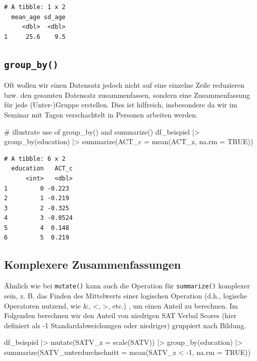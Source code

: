 \documentclass[
  letterpaper,
  DIV=11,
  numbers=noendperiod]{scrreprt}
\newenvironment{Shaded}{\begin{snugshade}}{\end{snugshade}}
\newcommand{\AttributeTok}[1]{\textcolor[rgb]{0.40,0.45,0.13}{#1}}
\newcommand{\CommentTok}[1]{\textcolor[rgb]{0.37,0.37,0.37}{#1}}
\newcommand{\ConstantTok}[1]{\textcolor[rgb]{0.56,0.35,0.01}{#1}}
\newcommand{\DecValTok}[1]{\textcolor[rgb]{0.68,0.00,0.00}{#1}}
\newcommand{\FunctionTok}[1]{\textcolor[rgb]{0.28,0.35,0.67}{#1}}
\newcommand{\NormalTok}[1]{\textcolor[rgb]{0.00,0.23,0.31}{#1}}
\newcommand{\SpecialCharTok}[1]{\textcolor[rgb]{0.37,0.37,0.37}{#1}}
\begin{document}
\begin{verbatim}
# A tibble: 1 x 2
  mean_age sd_age
     <dbl>  <dbl>
1     25.6    9.5
\end{verbatim}

\subsection{\texorpdfstring{\texttt{group\_by()}}{group\_by()}}\label{group_by}

Oft wollen wir einen Datensatz jedoch nicht auf eine einzelne Zeile
reduzieren bzw. den gesamten Datensatz zusammenfassen, sondern eine
Zusammenfassung für jede (Unter-)Gruppe erstellen. Dies ist hilfreich,
insbesondere da wir im Seminar mit Tagen verschachtelt in Personen
arbeiten werden.

\begin{Shaded}
\begin{Highlighting}[]
\CommentTok{\# illustrate use of group\_by() and summarize()}
\NormalTok{df\_beispiel }\SpecialCharTok{|\textgreater{}} 
  \FunctionTok{group\_by}\NormalTok{(education) }\SpecialCharTok{|\textgreater{}} 
  \FunctionTok{summarize}\NormalTok{(}\AttributeTok{ACT\_c =} \FunctionTok{mean}\NormalTok{(ACT\_z, }\AttributeTok{na.rm =} \ConstantTok{TRUE}\NormalTok{))}
\end{Highlighting}
\end{Shaded}

\begin{verbatim}
# A tibble: 6 x 2
  education   ACT_c
      <int>   <dbl>
1         0 -0.223 
2         1 -0.219 
3         2 -0.325 
4         3 -0.0524
5         4  0.148 
6         5  0.219 
\end{verbatim}

\subsection{Komplexere
Zusammenfassungen}\label{komplexere-zusammenfassungen}

Ähnlich wie bei \texttt{mutate()} kann auch die Operation für
\texttt{summarize()} komplexer sein, z. B. das Finden des Mittelwerts
einer logischen Operation (d.h., logische Operatoren nutzend, wie \&,
\textless, \textgreater, \textbar{} etc.) , um einen Anteil zu
berechnen. Im Folgenden berechnen wir den Anteil von niedrigen SAT
Verbal Scores (hier definiert als -1 Standardabweichungen oder
niedriger) gruppiert nach Bildung.

\begin{Shaded}
\begin{Highlighting}[]
\NormalTok{df\_beispiel }\SpecialCharTok{|\textgreater{}} 
  \FunctionTok{mutate}\NormalTok{(}\AttributeTok{SATV\_z =} \FunctionTok{scale}\NormalTok{(SATV)) }\SpecialCharTok{|\textgreater{}} 
  \FunctionTok{group\_by}\NormalTok{(education) }\SpecialCharTok{|\textgreater{}}
  \FunctionTok{summarize}\NormalTok{(}\AttributeTok{SATV\_unterdurchschnitt =} \FunctionTok{mean}\NormalTok{(SATV\_z }\SpecialCharTok{\textless{}} \SpecialCharTok{{-}}\DecValTok{1}\NormalTok{, }\AttributeTok{na.rm =} \ConstantTok{TRUE}\NormalTok{))}
\end{Highlighting}
\end{Shaded}
\end{document}
